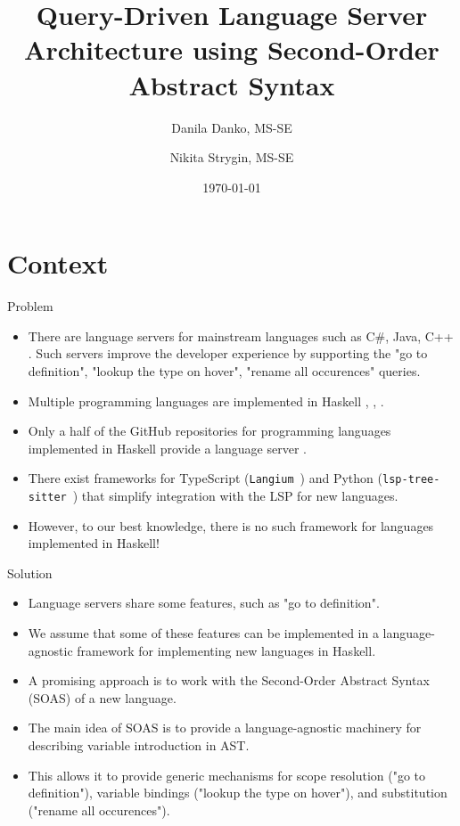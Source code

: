 \documentclass[serif, aspectratio=169]{beamer}
\author[Danko, Strygin]{Danila Danko, MS-SE \inst{1} \and Nikita Strygin, MS-SE \inst{1} \and \newline \newline {Supervisor: Nikolai Kudasov \inst{1}}}
\title{Query-Driven Language Server Architecture using Second-Order Abstract Syntax}
\institute{
    \inst{1}Innopolis University
}
\date{\small \today}
\begin{document}
\begin{frame}
    \titlepage
\end{frame}

\begin{frame}
    \tableofcontents[sectionstyle=show,
        subsectionstyle=show/shaded/hide,
        subsubsectionstyle=show/shaded/hide]
\end{frame}

\section{Context}

\begin{frame}{Problem}
    \begin{itemize}
        [<+-| alert+>] %
        \item There are language servers \cite{noauthor_language_server_protocol_2024} for mainstream languages such as C\#, Java, C++ \cite{lsp_implementations}. Such servers improve the developer experience by supporting the "go to definition", "lookup the type on hover", "rename all occurences" queries.
        \item Multiple programming languages are implemented in Haskell \cite{github_haskell_programming_language}, \cite{hackage_formal_languages}, \cite{hackage_language}.
        \item Only a half of the GitHub repositories for programming languages implemented in Haskell provide a language server \cite{github_lsp_module}.
        \item There exist frameworks for TypeScript (\texttt{Langium}~\cite{noauthor_langium_nodate}) and Python (\texttt{lsp-tree-sitter}~\cite{noauthor_neomuttlsp-tree-sitter_2024}) that simplify integration with the LSP for new languages.
        \item However, to our best knowledge, there is no such framework for languages implemented in Haskell!
    \end{itemize}
\end{frame}

\begin{frame}{Solution}
    \begin{itemize}
        [<+-| alert+>] %
        \item Language servers share some features, such as "go to definition".
        \item We assume that some of these features can be implemented in a language-agnostic framework for implementing new languages in Haskell.
        \item A promising approach is to work with the Second-Order Abstract Syntax (SOAS) \cite{fiore_formal_2022} of a new language.
        \item The main idea of SOAS is to provide a language-agnostic machinery for describing variable introduction in AST.
        \item This allows it to provide generic mechanisms for scope resolution ("go to definition"), variable bindings ("lookup the type on hover"), and substitution ("rename all occurences").
    \end{itemize}
\end{frame}
\end{document}
